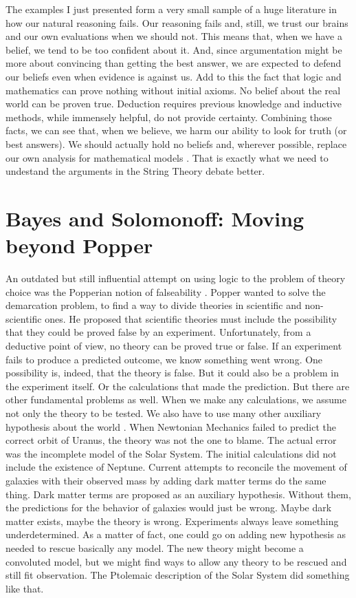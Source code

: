 \documentclass{article}
\begin{document}
	The examples I just presented form a very small sample of a huge literature in how our natural reasoning fails. Our reasoning fails and, still, we trust our brains and our own evaluations when we should not. This means that, when we have a belief, we tend to be too confident about it. And, since argumentation might be more about convincing than getting the best answer, we are expected to defend our beliefs even when evidence is against us. Add to this the fact that logic and mathematics can prove nothing without initial axioms. No belief about the real world can be proven true. Deduction requires previous knowledge and inductive methods, while immensely helpful, do not provide certainty. Combining those facts, we can see that, when we believe, we harm our ability to look for truth (or best answers). We should actually hold no beliefs and, wherever possible, replace our own analysis for mathematical models \cite{martins16a}. That is exactly what we need to undestand the arguments in the String Theory debate better.
	
	
	
	\section{Bayes and Solomonoff: Moving beyond Popper}
	
	An outdated but still influential attempt on using logic to the problem of theory choice was the Popperian notion of falseability \cite{popper59}. Popper wanted to solve the demarcation problem, to find a way to divide theories in scientific and non-scientific ones. He proposed that scientific theories must include the possibility that they could be proved false by an experiment. Unfortunately, from a deductive point of view, no theory can be proved true or false. If an experiment fails to produce a predicted outcome, we know something went wrong. One possibility is, indeed, that the theory is false. But it could also be a problem in the experiment itself. Or the calculations that made the prediction. But there are other fundamental problems as well. When we make any calculations, we assume not only the theory to be tested. We also have to use many other auxiliary hypothesis about the world \cite{duhem89a,quine69}. When Newtonian Mechanics failed to predict the correct orbit of Uranus, the theory was not the one to blame. The actual error was the incomplete model of the Solar System. The initial calculations did not include the existence of Neptune. Current attempts to reconcile the movement of galaxies with their observed mass by adding dark matter terms do the same thing. Dark matter terms are proposed as an auxiliary hypothesis. Without them, the predictions for the behavior of galaxies would just be wrong. Maybe dark matter exists, maybe the theory is wrong. Experiments always leave something underdetermined. As a matter of fact, one could go on adding new hypothesis as needed to rescue basically any model. The new theory might become a convoluted model, but we might find ways to allow any theory to be rescued and still fit observation. The Ptolemaic description of the Solar System did something like that.
	
\end{document}
